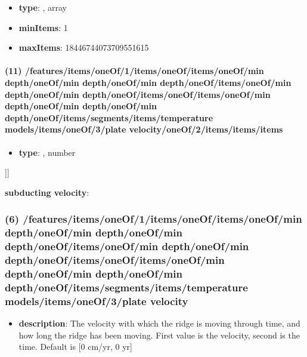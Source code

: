 \begin{itemize}[leftmargin=10em]\item {\bf type}: , array\item {\bf minItems}: 1
\item {\bf maxItems}: 18446744073709551615
\end{itemize}\paragraph{(11) /features/items/oneOf/1/items/oneOf/items/oneOf/min depth/oneOf/min depth/oneOf/min depth/oneOf/items/oneOf/min depth/oneOf/min depth/oneOf/items/oneOf/items/oneOf/min depth/oneOf/min depth/oneOf/min depth/oneOf/items/segments/items/temperature models/items/oneOf/3/plate velocity/oneOf/2/items/items/items}
\begin{itemize}[leftmargin=11em]\item {\bf type}: , number\end{itemize}]]\item {\bf subducting velocity}: \subsubsection{(6) /features/items/oneOf/1/items/oneOf/items/oneOf/min depth/oneOf/min depth/oneOf/min depth/oneOf/items/oneOf/min depth/oneOf/min depth/oneOf/items/oneOf/items/oneOf/min depth/oneOf/min depth/oneOf/min depth/oneOf/items/segments/items/temperature models/items/oneOf/3/plate velocity}
\begin{itemize}[leftmargin=6em]\item {\bf description}: The velocity with which the ridge is moving through time, and how long the ridge has been moving. First value is the velocity, second is the time. Default is [0 cm/yr, 0 yr]
\end{itemize}
